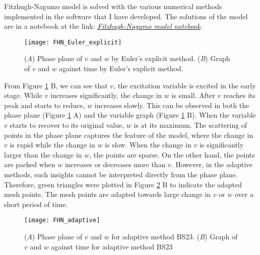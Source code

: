 Fitzhugh-Nagumo model is solved with the various numerical methods implemented in the software that I have developed. The solutions of the model are in a notebook at the link:  \href{https://nbviewer.jupyter.org/github/FarmHJ/numerical-solver/blob/main/examples/fitzhugh_nagumo.ipynb}{\underline{\emph{Fitzhugh-Nagumo model notebook}}}. 

\begin{figure}
    \texttt{[image: FHN\_Euler\_explicit]}
    \caption{(\textit{A}) Phase plane of $v$ and $w$ by Euler's explicit method. (\textit{B}) Graph of $v$ and $w$ against time by Euler's explicit method.}
    \label{fig:FHN_Euler_explicit}
\end{figure}

From Figure \ref{fig:FHN_Euler_explicit} B, we can see that $v$, the excitation variable is excited in the early stage. While $v$ increases significantly, the change in $w$ is small. After $v$ reaches its peak and starts to reduce, $w$ increases slowly. This can be observed in both the phase plane (Figure \ref{fig:FHN_Euler_explicit} A) and the variable graph (Figure \ref{fig:FHN_Euler_explicit} B). When the variable $v$ starts to recover to its original value, $w$ is at its maximum. The scattering of points in the phase plane captures the feature of the model, where the change in $v$ is rapid while the change in $w$ is slow. When the change in $v$ is significantly larger than the change in $w$, the points are sparse. On the other hand, the points are packed when $w$ increases or decreases more than $v$. However, in the adaptive methods, such insights cannot be interpreted directly from the phase plane. Therefore, green triangles were plotted in Figure \ref{fig:FHN_adaptive} B to indicate the adapted mesh points. The mesh points are adapted towards large change in $v$ or $w$ over a short period of time.

\begin{figure}
    \texttt{[image: FHN\_adaptive]}
    \caption{(\textit{A}) Phase plane of $v$ and $w$ for adaptive method BS23. (\textit{B}) Graph of $v$ and $w$ against time for adaptive method BS23}
    \label{fig:FHN_adaptive}
\end{figure}

